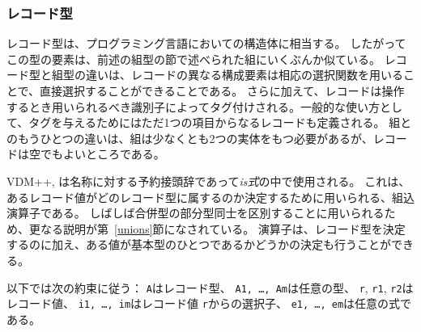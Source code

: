 \documentclass[\pformat,12pt]{jarticle}
\newcommand{\vdmslpp}[2]{%
#2
}
\newcommand{\vdmsl}{VDM-SL}
\newcommand{\vdmpp}{VDM++}
\begin{document}
\subsubsection{レコード型}\label{records}

レコード型は、プログラミング言語においての構造体に相当する。
したがってこの型の要素は、前述の組型の節で述べられた組にいくぶんか似ている。
レコード型と組型の違いは、レコードの異なる構成要素は相応の選択関数を用いることで、直接選択することができることである。 
さらに加えて、レコードは操作するとき用いられるべき識別子によってタグ付けされる。一般的な使い方として、タグを与えるためにはただ1つの項目からなるレコードも定義される。
組とのもうひとつの違いは、組は少なくとも2つの実体をもつ必要があるが、レコードは空でもよいところである。

\vdmslpp{\vdmsl,}{\vdmpp,}  は名称に対する予約接頭辞であって{\it is式}の中で使用される。 
これは、あるレコード値がどのレコード型に属するのか決定するために用いられる、組込演算子である。
しばしば合併型の部分型同士を区別することに用いられるため、更なる説明が第~\ref{unions}節になされている。 
演算子は、レコード型を決定するのに加え、ある値が基本型のひとつであるかどうかの決定も行うことができる。
 
以下では次の約束に従う： {\tt A}はレコード型、 {\tt A1, \ldots, Am}は任意の型、 {\tt r}, {\tt r1}, {\tt r2}はレコード値、 {\tt i1, \ldots, im}はレコード値 {\tt r}からの選択子、 {\tt e1, \ldots, em}は任意の式である。
\end{document}
